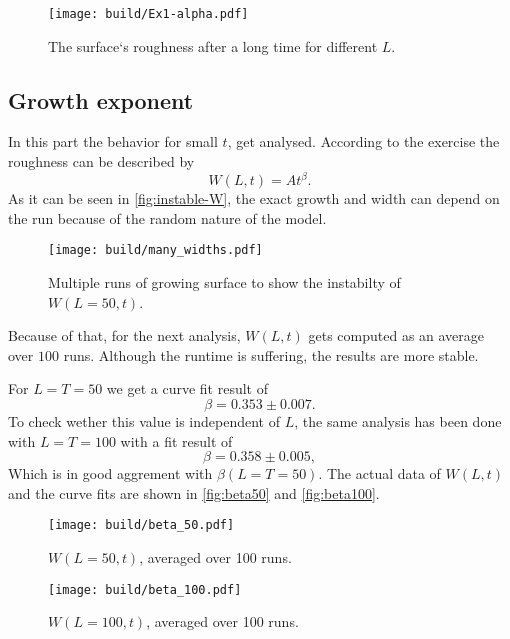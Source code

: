 \begin{figure}
	\centering
  \texttt{[image: build/Ex1-alpha.pdf]}
  \caption{The surface`s roughness after a long time for different $L$.}
  \label{fig:alpha}
\end{figure}

\subsection{Growth exponent }
In this part the behavior for small $t$, get analysed. According to the exercise the roughness can be described by
\[
   W(L,t) = At^\beta.
\]
As it can be seen in \autoref{fig:instable-W}, the exact growth and width can depend on the run because of the random
nature of the model. 

\begin{figure}
	\centering
  \texttt{[image: build/many\_widths.pdf]}
  \caption{Multiple runs of growing surface to show the instabilty of $W(L=50,t)$.}
  \label{fig:instable-W}
\end{figure}
Because of that, for the next analysis, $W(L,t)$ gets computed as an average over $100$ runs. Although the runtime is
suffering, the results are more stable.

For $L=T=50$ we get a curve fit result of
\[
  \beta = 0.353 \pm 0.007.
\]
To check wether this value is independent of $L$, the same analysis has been done with $L = T = 100$ with a fit result
of
\[
  \beta = 0.358 \pm 0.005,
\]
Which is in good aggrement with $\beta(L=T=50)$. The actual data of $W(L,t)$ and the curve fits are shown in
\autoref{fig:beta50} and
\autoref{fig:beta100}.
\begin{figure}
	\centering
  \texttt{[image: build/beta\_50.pdf]}
  \caption{$W(L=50,t)$, averaged over 100 runs.}
  \label{fig:beta50}
\end{figure}
\begin{figure}
	\centering
  \texttt{[image: build/beta\_100.pdf]}
  \caption{$W(L=100,t)$, averaged over 100 runs.}
  \label{fig:beta100}
\end{figure}
